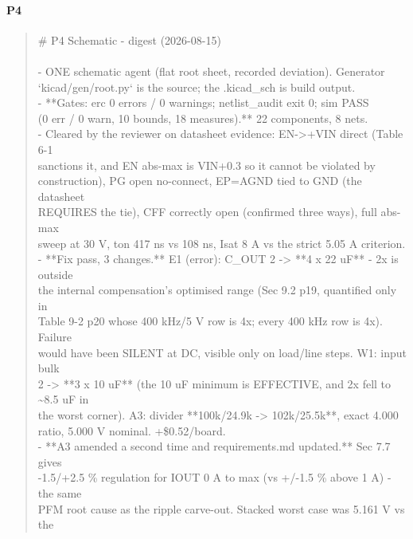 \documentclass[11pt,a4paper]{article}
\begin{document}
\paragraph*{P4}
\begin{quote}\small\ttfamily\raggedright
\# P4 Schematic - digest (2026-08-15)\\
~\\
- ONE schematic agent (flat root sheet, recorded deviation). Generator\\
  `kicad/gen/root.py` is the source; the .kicad\_sch is build output.\\
- {*}{*}Gates: erc 0 errors / 0 warnings; netlist\_audit exit 0; sim PASS\\
  (0 err / 0 warn, 10 bounds, 18 measures).{*}{*} 22 components, 8 nets.\\
- Cleared by the reviewer on datasheet evidence: EN-\textgreater{}+VIN direct (Table 6-1\\
  sanctions it, and EN abs-max is VIN+0.3 so it cannot be violated by\\
  construction), PG open no-connect, EP=AGND tied to GND (the datasheet\\
  REQUIRES the tie), CFF correctly open (confirmed three ways), full abs-max\\
  sweep at 30 V, ton 417 ns vs 108 ns, Isat 8 A vs the strict 5.05 A criterion.\\
- {*}{*}Fix pass, 3 changes.{*}{*} E1 (error): C\_OUT 2 -\textgreater{} {*}{*}4 x 22 uF{*}{*} - 2x is outside\\
  the internal compensation's optimised range (Sec 9.2 p19, quantified only in\\
  Table 9-2 p20 whose 400 kHz/5 V row is 4x; every 400 kHz row is 4x). Failure\\
  would have been SILENT at DC, visible only on load/line steps. W1: input bulk\\
  2 -\textgreater{} {*}{*}3 x 10 uF{*}{*} (the 10 uF minimum is EFFECTIVE, and 2x fell to \textasciitilde{}8.5 uF in\\
  the worst corner). A3: divider {*}{*}100k/24.9k -\textgreater{} 102k/25.5k{*}{*}, exact 4.000\\
  ratio, 5.000 V nominal. +\$0.52/board.\\
- {*}{*}A3 amended a second time and requirements.md updated.{*}{*} Sec 7.7 gives\\
  -1.5/+2.5 \% regulation for IOUT 0 A to max (vs +/-1.5 \% above 1 A) - the same\\
  PFM root cause as the ripple carve-out. Stacked worst case was 5.161 V vs the\\

\end{quote}
\end{document}
